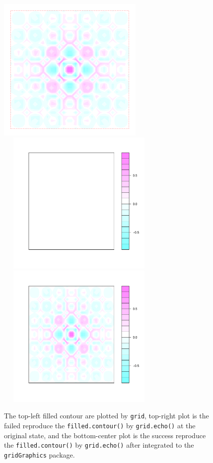 \documentclass[paper=a4, fontsize=11pt]{report}
\begin{document}
\begin{figure}[h]
\begin{center}
  \includegraphics[height = 7cm, width = 7cm]{figure/filledContour_origin_02.pdf}
  \includegraphics[height = 7cm, width = 8cm]{figure/filledContour_origin_03.pdf}
  \includegraphics[height = 7cm, width = 8cm]{figure/filledContour_origin_01.pdf}

  \caption{The top-left filled contour are plotted by \texttt{grid}, top-right plot is the failed reproduce the \texttt{filled.contour()} by \texttt{grid.echo()} at the original state, and the bottom-center plot is the success reproduce the \texttt{filled.contour()} by \texttt{grid.echo()} after integrated to the \texttt{gridGraphics} package.}
  	\label{fill_4.3}
\end{center}
\end{figure}
\end{document}
